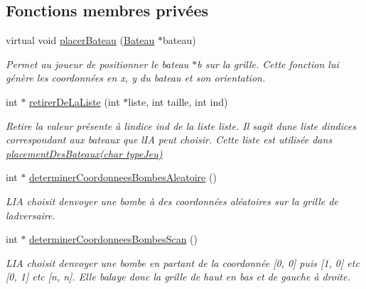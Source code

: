 \subsection*{Fonctions membres privées}
\begin{DoxyCompactItemize}
\item 
virtual void \hyperlink{class_joueur_i_a_a70a56322ca6eeeb52612510d7e22d388}{placer\+Bateau} (\hyperlink{class_bateau}{Bateau} $\ast$bateau)
\begin{DoxyCompactList}\small\item\em Permet au joueur de positionner le bateau {\ttfamily $\ast$b} sur la grille. Cette fonction lui génère les coordonnées en x, y du bateau et son orientation. \end{DoxyCompactList}\item 
int $\ast$ \hyperlink{class_joueur_i_a_a83b8a54bbc3d6fad8fbdaee79a5a8246}{retirer\+De\+La\+Liste} (int $\ast$liste, int taille, int ind)
\begin{DoxyCompactList}\small\item\em Retire la valeur présente à l\textquotesingle{}indice {\ttfamily ind} de la liste {\ttfamily liste}. Il s\textquotesingle{}agit d\textquotesingle{}une liste d\textquotesingle{}indices correspondant aux bateaux que l\textquotesingle{}IA peut choisir. Cette liste est utilisée dans \hyperlink{class_joueur_i_a_a6d7592fa8c653cb5420270d61467419b}{placement\+Des\+Bateaux(char type\+Jeu)} \end{DoxyCompactList}\item 
int $\ast$ \hyperlink{class_joueur_i_a_ad1fa6503f6fce1560129ee8cb94a1475}{determiner\+Coordonnees\+Bombes\+Aleatoire} ()
\begin{DoxyCompactList}\small\item\em L\textquotesingle{}IA choisit d\textquotesingle{}envoyer une bombe à des coordonnées aléatoires sur la grille de l\textquotesingle{}adversaire. \end{DoxyCompactList}\item 
int $\ast$ \hyperlink{class_joueur_i_a_af67d4959a40d9e99f0f8d99eaaf73c49}{determiner\+Coordonnees\+Bombes\+Scan} ()
\begin{DoxyCompactList}\small\item\em L\textquotesingle{}IA choisit d\textquotesingle{}envoyer une bombe en partant de la coordonnée \mbox{[}0, 0\mbox{]} puis \mbox{[}1, 0\mbox{]} etc \mbox{[}0, 1\mbox{]} etc \mbox{[}n, n\mbox{]}. Elle balaye donc la grille de haut en bas et de gauche à droite. \end{DoxyCompactList}\end{DoxyCompactItemize}
